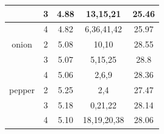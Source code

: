 \documentclass[conference]{IEEEtran}
\begin{document}
\begin{table}[htbp]
\begin{center}
\begin{tabular}{|c|c|c|c|c|}
    \hline
    & 3 & 4.88 & 13,15,21 & 25.46\\
    \hline
    & 4 & 4.82 & 6,36,41,42 & 25.97\\
    \hline
    onion & 2 & 5.08 & 10,10 & 28.55\\
    \hline
    & 3 & 5.07 & 5,15,25 & 28.8\\
    \hline
    & 4 & 5.06 & 2,6,9 & 28.36\\
    \hline
    pepper & 2 & 5.25 & 2,4 & 27.47\\
    \hline
    & 3 & 5.18 & 0,21,22 & 28.14\\
    \hline
    & 4 & 5.10 & 18,19,20,38 & 28.06\\
    \hline
\end{tabular}
\label{dataset_sample}
\end{center}
\end{table}
\end{document}
